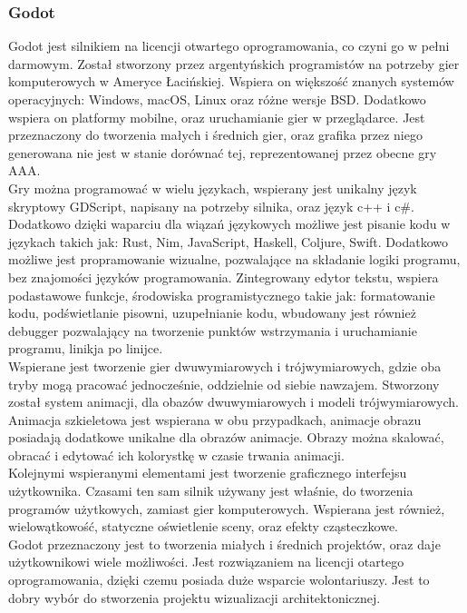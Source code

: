 \documentclass{article} %
\begin{document}
        \subsubsection*{Godot}
        Godot jest silnikiem na licencji otwartego oprogramowania, co czyni go w pełni darmowym. Został stworzony przez argentyńskich programistów na potrzeby gier komputerowych w Ameryce Łacińskiej. Wspiera on większość znanych systemów operacyjnych: Windows, macOS, Linux oraz różne wersje BSD. Dodatkowo wspiera on platformy mobilne, oraz uruchamianie gier w przeglądarce. Jest przeznaczony do tworzenia małych i średnich gier, oraz grafika przez niego generowana nie jest w stanie dorównać tej, reprezentowanej przez obecne gry AAA.
        \\
        
        Gry można programować w wielu językach, wspierany jest unikalny język skryptowy GDScript, napisany na potrzeby silnika, oraz język c++ i c\#. Dodatkowo dzięki waparciu dla wiązań językowych możliwe jest pisanie kodu w językach takich jak: Rust, Nim, JavaScript, Haskell, Coljure, Swift. Dodatkowo możliwe jest propramowanie wizualne, pozwalające na składanie logiki programu, bez znajomości języków programowania. Zintegrowany edytor tekstu, wspiera podastawowe funkcje, środowiska programistycznego takie jak: formatowanie kodu, podświetlanie pisowni, uzupełnianie kodu, wbudowany jest również debugger pozwalający na tworzenie punktów wstrzymania i uruchamianie programu, linikja po linijce.
        \\
        
        Wspierane jest tworzenie gier dwuwymiarowych i trójwymiarowych, gdzie oba tryby mogą pracować jednocześnie, oddzielnie od siebie nawzajem. Stworzony został system animacji, dla obazów dwuwymiarowych i modeli trójwymiarowych. Animacja szkieletowa jest wspierana w obu przypadkach, animacje obrazu posiadają dodatkowe unikalne dla obrazów animacje. Obrazy można skalować, obracać i edytować ich kolorystkę w czasie trwania animacji. 
        \\
        
        Kolejnymi wspieranymi elementami jest tworzenie graficznego interfejsu użytkownika. Czasami ten sam silnik używany jest właśnie, do tworzenia programów użytkowych, zamiast gier komputerowych. Wspierana jest również, wielowątkowość, statyczne oświetlenie sceny, oraz efekty cząsteczkowe.
        \\
        
        Godot przeznaczony jest to tworzenia miałych i średnich projektów, oraz daje użytkownikowi wiele możliwości. Jest rozwiązaniem na licencji otartego oprogramowania, dzięki czemu posiada duże wsparcie wolontariuszy. Jest to dobry wybór do stworzenia projektu wizualizacji architektonicznej.
        \\
        
\end{document}
